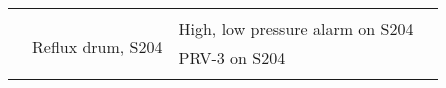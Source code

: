 \begin{table}[h]
{\begin{tabular}{@{}llll@{}}
\multicolumn{1}{|l|}{}                    & \multicolumn{1}{l|}{}                                                                                      & \multicolumn{1}{l|}{}                                                                                                                                                                                                               & \multicolumn{1}{l|}{}                                                                                                                                                                                                                                                        \\ \cmidrule(l){2-4} 
\multicolumn{1}{|l|}{}                    & \multicolumn{1}{l|}{\multirow{3}{*}{Reflux drum, S204}}                                                    & \multicolumn{1}{l|}{High, low pressure alarm on S204}                                                                                                                                                                               & \multicolumn{1}{l|}{}                                                                                                                                                                                                                                                        \\ \cmidrule(l){3-4} 
\multicolumn{1}{|l|}{}                    & \multicolumn{1}{l|}{}                                                                                      & \multicolumn{1}{l|}{PRV-3 on S204}                                                                                                                                                                                                  & \multicolumn{1}{l|}{}                                                                                                                                                                                                                                                        \\ \cmidrule(l){3-4} 
\multicolumn{1}{|l|}{}                    & \multicolumn{1}{l|}{}                                                                                      & \multicolumn{1}{l|}{}                                                                                                                                                                                                               & \multicolumn{1}{l|}{}                                                                                                                                                                                                                                                        \\ \cmidrule(l){2-4} 

\end{tabular}}
\end{table}
